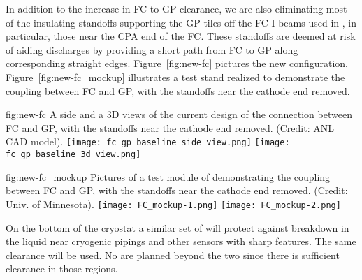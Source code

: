 In addition to the increase in FC to GP clearance, we are also eliminating most of the insulating standoffs supporting the GP tiles off the FC I-beams used in , in particular, those near the CPA end of the FC.  These standoffs  are deemed at risk of aiding discharges by providing a short path from FC to GP along corresponding straight edges.  Figure~\ref{fig:new-fc} pictures the new configuration. Figure~\ref{fig:new-fc_mockup} illustrates a test stand realized to demonstrate the coupling between FC and GP, with the standoffs near the cathode end removed. 

\begin{dunefigure}
{fig:new-fc}
{A side and a 3D views of the current design of the connection between FC and GP, with the standoffs near the cathode end removed. (Credit: ANL CAD model).}%
\texttt{[image: fc\_gp\_baseline\_side\_view.png]}
\texttt{[image: fc\_gp\_baseline\_3d\_view.png]}
\end{dunefigure}

\begin{dunefigure}
{fig:new-fc_mockup}
{Pictures of a test module of demonstrating the coupling between FC and GP, with the standoffs near the cathode end removed. (Credit: Univ. of Minnesota).}%
\texttt{[image: FC\_mockup-1.png]}
\texttt{[image: FC\_mockup-2.png]}
\end{dunefigure}

On the bottom of the cryostat a similar set of  %
will protect against %
breakdown in the liquid near cryogenic pipings and other sensors with sharp features. The same clearance will be used. No  are planned beyond the two  since there is sufficient clearance in those regions.  



